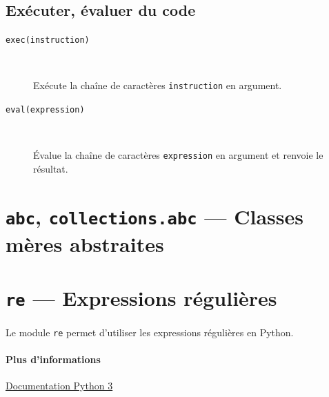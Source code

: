 \documentclass[a4paper, 10pt]{article}
\begin{document}
\subsection{Exécuter, évaluer du code}
\begin{description}
    \item[\texttt{exec(instruction)}]~
    
    Exécute la chaîne de caractères \texttt{instruction} en argument.

    \item[\texttt{eval(expression)}]~

    Évalue la chaîne de caractères \texttt{expression} en argument et renvoie le résultat.
\end{description}

\section[{\footnotesize\texttt{abc}}, {\footnotesize\texttt{collections.abc}} --- Classes mères abstraites]{{\normalfont\bfseries\large\texttt{abc}}, {\normalfont\bfseries\large\texttt{collections.abc}} --- Classes mères abstraites}\label{abc}

\section[{\footnotesize\texttt{re}} --- Expressions régulières]{{\normalfont\bfseries\large\texttt{re}} --- Expressions régulières}
Le module \texttt{re}  permet d'utiliser les expressions régulières en Python.
\paragraph{Plus d'informations} \href{https://docs.python.org/fr/3/library/re.html}{Documentation Python 3}
\end{document}
